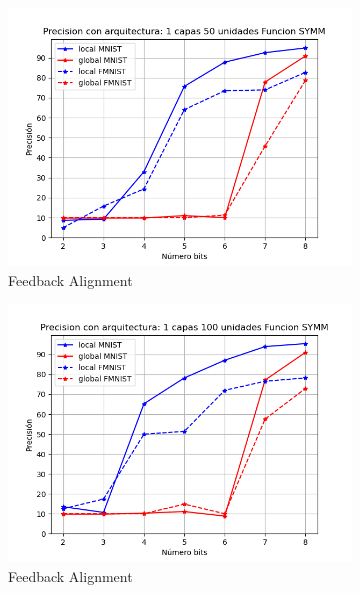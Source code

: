 \begin{figure}[H]
\begin{subfigure}[H]{0.475\textwidth}
    \includegraphics[width=\textwidth]{imagenes/fa/Precision con arquitectura: 1 capas 50 unidades Funcion SYMM.png}
    \caption{Feedback Alignment}
    \end{subfigure}
    \begin{subfigure}[H]{0.475\textwidth}
    \includegraphics[width=\textwidth]{imagenes/fa/Precision con arquitectura: 1 capas 100 unidades Funcion SYMM.png}
    \caption{Feedback Alignment}
    \end{subfigure}
    \begin{subfigure}[H]{0.475\textwidth}

\end{subfigure}
\end{figure}
